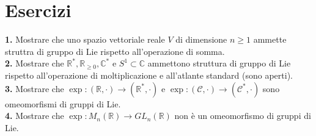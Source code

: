 \documentclass[oneside, 11pt]{amsbook}
\newcommand{\C}{\mathcal{C}}
\newcommand{\R}{\mathbb{R}}
\newcommand{\cC}{\mathbb{C}}
\newcommand{\gr}[1]{\textbf{#1}}
\newcommand{\0}{{(0)}}
\newcommand{\3}{{(3)}}
\theoremstyle{colonplain}
\theoremstyle{colondefinition}
\theoremstyle{colonremark}
\numberwithin{equation}{chapter}
\begin{document}
\section{Esercizi}
\gr{1.} Mostrare che uno spazio vettoriale reale $V$ di dimensione $n \geq 1$ ammette struttra di gruppo di Lie rispetto all'operazione di somma. \\

\gr{2.} Mostrare che $\R^*, \R_{\geq 0}, \cC^*$ e $S^1 \subset \cC$ ammettono struttura di gruppo di Lie rispetto all'operazione di moltiplicazione e all'atlante standard (sono aperti). \\

\gr{3.} Mostrare che $\exp : (\R, \cdot) \longrightarrow (\R^*, \cdot)$ e $\exp : (\C, \cdot) \longrightarrow (\C^*, \cdot)$ sono omeomorfismi di gruppi di Lie. \\

\gr{4.} Mostrare che $\exp : M_n(\R) \longrightarrow GL_n(\R)$ non è un omeomorfismo di gruppi di Lie.
\end{document}
